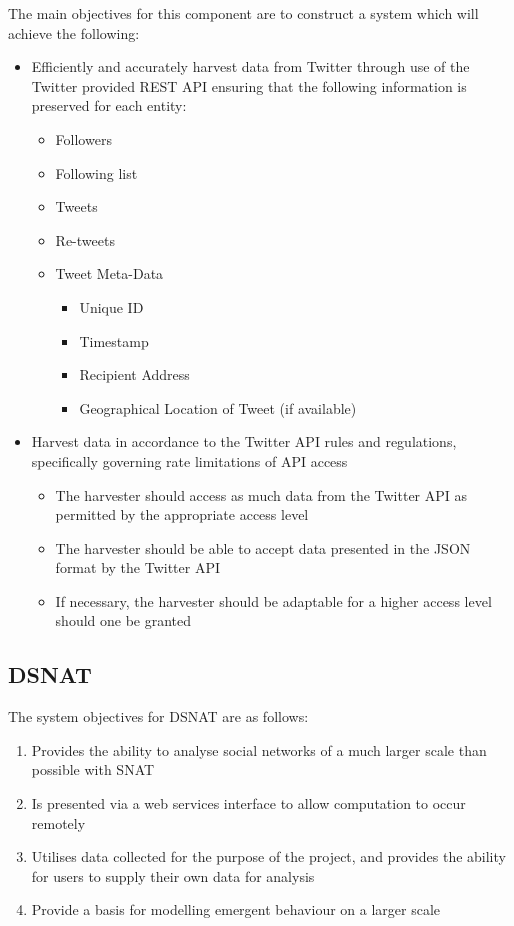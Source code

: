 The main objectives for this component are to construct a system which will achieve the following:

\begin{itemize}
\item Efficiently and accurately harvest data from Twitter through use of the Twitter provided
 REST API ensuring that the following information is preserved for each entity:
\begin{itemize}
\item Followers
\item Following list
\item Tweets
\item Re-tweets
\item Tweet Meta-Data
\begin{itemize}
	\item Unique ID
\item Timestamp
\item Recipient Address
\item Geographical Location of Tweet (if available)
\end{itemize}
\end{itemize}
\item Harvest data in accordance to the Twitter API rules and regulations, specifically governing rate limitations of API access
\begin{itemize}
\item The harvester should access as much data from the Twitter API as permitted by the appropriate access level
\item The harvester should be able to accept data presented in the JSON format by the Twitter API
\item If necessary, the harvester should be adaptable for a higher access level should one be granted
\end{itemize}
\end{itemize}


\subsection{DSNAT}

The system objectives for DSNAT are as follows:

\begin{enumerate}
  \item Provides the ability to analyse social networks of a much larger scale than possible with SNAT
  \item Is presented via a web services interface to allow computation to occur remotely
  \item Utilises data collected for the purpose of the project, and provides the ability for users to supply their own data for analysis
  \item Provide a basis for modelling emergent behaviour on a larger scale
\end{enumerate}

